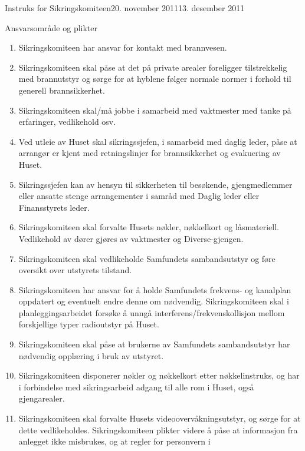 \documentclass[../fsbok.tex]{subfiles}
\begin{document}
\begin{instruks}{Instruks for Sikringskomiteen}{20. november 2011}{13. desember 2011}
\begin{instruksledd}{Ansvarsområde og plikter}
\begin{enumerate}
                sikringskomiteen til resten av Husets gjengmedlemmer. Sikringssjefen
                har ansvaret for brannøvelser.
            \item Sikringskomiteen har ansvar for kontakt med brannvesen.
            \item Sikringskomiteen skal påse at det på private arealer foreligger
                tilstrekkelig med brannutstyr og sørge for at
                hyblene følger normale normer i forhold til generell brannsikkerhet.
            \item Sikringskomiteen skal/må jobbe i samarbeid med vaktmester med tanke på
                erfaringer, vedlikehold osv.
            \item Ved utleie av Huset skal sikringssjefen, i samarbeid med daglig leder,
                påse at arrangør er kjent med
                retningslinjer for brannsikkerhet og evakuering av Huset.
            \item Sikringssjefen kan av hensyn til sikkerheten til besøkende,
                gjengmedlemmer eller ansatte stenge
                arrangementer i samråd med Daglig leder eller Finansstyrets leder.
            \item Sikringskomiteen skal forvalte Husets nøkler, nøkkelkort og låsmateriell.
                Vedlikehold av dører gjøres av
                vaktmester og Diverse-gjengen.
	    \item Sikringskomiteen skal vedlikeholde Samfundets sambandsutstyr og føre oversikt
		over utstyrets tilstand.
            \item Sikringskomiteen har ansvar for å holde Samfundets frekvens- og kanalplan
		oppdatert og eventuelt endre denne om nødvendig. Sikringskomiteen skal i
		planleggingsarbeidet forsøke å unngå interferens/frekvenskollisjon mellom
		forskjellige typer radioutstyr på Huset.
            \item Sikringskomiteen skal påse at brukerne av Samfundets sambandsutstyr har
		nødvendig opplæring i bruk av utstyret.
            \item Sikringskomiteen disponerer nøkler og nøkkelkort etter nøkkelinstruks,
                og har i forbindelse med
                sikringsarbeid adgang til alle rom i Huset, også gjengarealer.
            \item Sikringskomiteen skal forvalte Husets videoovervåkningsutstyr, og sørge
                for at dette vedlikeholdes.
                Sikringskomiteen plikter videre å påse at informasjon fra anlegget ikke
                misbrukes, og at regler for personvern i

\end{enumerate}
\end{instruksledd}
\end{instruks}
\end{document}
